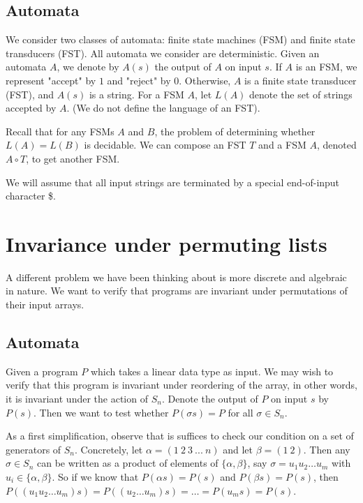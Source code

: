\documentclass{llncs}
\begin{document}
\subsection{Automata}
We consider two classes of automata: finite state machines (FSM) and finite state transducers (FST). All automata we consider are deterministic. Given an automata $A$, we denote by $A(s)$ the output of $A$ on input $s$. If $A$ is an FSM, we represent "accept" by $1$ and "reject" by $0$. Otherwise, $A$ is a finite state transducer (FST), and $A(s)$ is a string. For a FSM $A$, let $L(A)$ denote the set of strings accepted by $A$. (We do not define the language of an FST).

Recall that for any FSMs $A$ and $B$, the problem of determining whether $L(A) = L(B)$ is decidable. We can compose an FST $T$ and a FSM $A$, denoted $A \circ T$, to get another FSM. 

We will assume that all input strings are terminated by a special end-of-input character \$.

\section{Invariance under permuting lists}
\label{permlists}

A different problem we have been thinking about is more discrete
and algebraic in nature.
We want to verify that programs are invariant under
permutations of their input arrays.

\subsection{Automata}
Given a program $P$ which takes a linear data type
as input. We may wish to verify that this program
is invariant under reordering of the array,
in other words, it is invariant under the action of $S_n$.
Denote the output of $P$ on input $s$ by $P(s)$.
Then we want to test whether $P(\sigma s) = P$
for all $\sigma \in S_n$.

As a first simplification, observe that is
suffices to check our condition on a set
of generators of $S_n$.
Concretely, let $\alpha = (1\ 2\ 3\ ...\ n)$
and let $\beta = (1\ 2)$.
Then any $\sigma \in S_n$ can be written as
a product of elements of $\{\alpha,\beta\}$,
say $\sigma = u_1 u_2\ldots u_m$ with
$u_i \in \{\alpha,\beta\}$.
So if we know that $P(\alpha s) = P(s)$
and $P(\beta s) = P(s)$, then
$P((u_1 u_2 \ldots u_m)s)
= P((u_2 \ldots u_m)s)
= \ldots = P(u_ms) = P(s) $.
\end{document}
